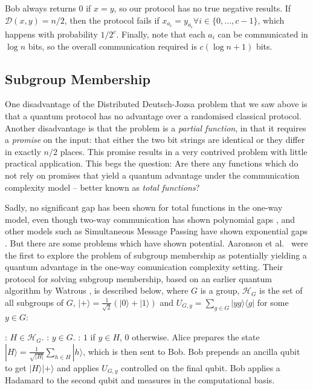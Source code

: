 \documentclass[a4paper]{article}
\begin{document}
        Bob always returns $0$ if $x = y$, so our protocol has no true negative results. If $\mathcal{D}(x, y) = n/2$, then the protocol fails if $x_{a_i} = y_{a_i} \forall i \in \{0,...,c-1\}$, which happens with probability $1/2^c$. Finally, note that each $a_i$ can be communicated in $\log n$ bits, so the overall communication required is $c(\log n + 1)$ bits.

        \subsection{Subgroup Membership}
        \label{sec:subgroup-membership}

        One disadvantage of the Distributed Deutsch-Jozsa problem that we saw above is that a quantum protocol has no advantage over a randomised classical protocol. Another disadvantage is that the problem is a {\em partial function}, in that it requires a {\em promise} on the input: that either the two bit strings are identical or they differ in exactly $n/2$ places. This promise results in a very contrived problem with little practical application. This begs the question: Are there any functions which do not rely on promises that yield a quantum advantage under the communication complexity model -- better known as {\em total functions}?

        Sadly, no significant gap has been shown for total functions in the one-way model, even though two-way communication has shown polynomial gaps \cite{Buhrman:1998:QVC:276698.276713}, and other models such as Simultaneous Message Passing have shown exponential gaps \cite{PhysRevLett.87.167902}. But there are some problems which have shown potential. Aaronson et al.~\cite{0902.3175} were the first to explore the problem of subgroup membership as potentially yielding a quantum advantage in the one-way comunication complexity setting. Their protocol for solving subgroup membership, based on an earlier quantum algorithm by Watrous \cite{Watrous:2000:SQP:795666.796590}, is described below, where $G$ is a group, $\mathscr{H}_G$ is the set of all subgroups of $G$, $|+\rangle = \frac{1}{\sqrt{2}}(|0\rangle + |1\rangle)$ and $U_{G, y} = \sum_{g \in G}|yg\rangle\langle g|$ for some $y \in G$:

        \begin{codebox}
            \zi {}: $H \in \mathscr{H}_G$.
            \zi {}: $y \in G$.
            \zi {}: $1$ if $y \in H$, $0$ otherwise.
            \li Alice prepares the state $|H\rangle = \frac{1}{\sqrt{|H|}}\sum_{h \in H}|h\rangle$, which is then sent to Bob.
            \li Bob prepends an ancilla qubit to get $|H\rangle|+\rangle$ and applies $U_{G, y}$ controlled on the final qubit.
            \li Bob applies a Hadamard to the second qubit and measures in the computational basis.
        \end{codebox}
\end{document}
